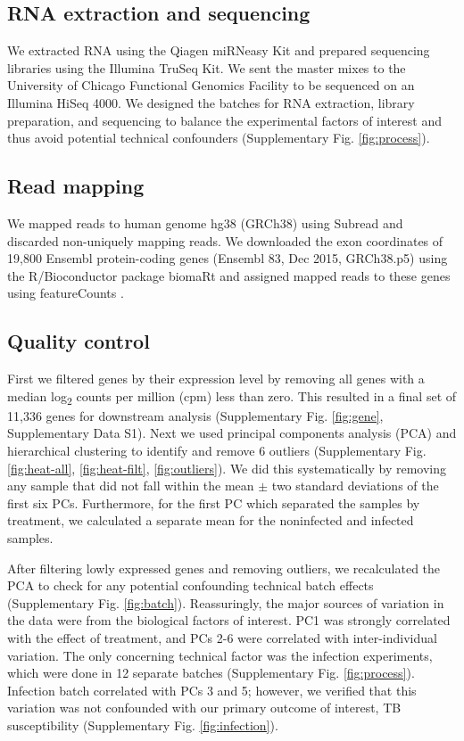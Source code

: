 \documentclass[fleqn,10pt]{wlscirep}
\begin{document}
\subsection*{RNA extraction and sequencing}

We extracted RNA using the Qiagen miRNeasy Kit and prepared sequencing
libraries using the Illumina TruSeq Kit. We sent the master mixes to
the University of Chicago Functional Genomics Facility to be sequenced
on an Illumina HiSeq 4000. We designed the batches for RNA extraction,
library preparation, and sequencing to balance the experimental
factors of interest and thus avoid potential technical confounders
(Supplementary Fig. \ref{fig:process}).
\subsection*{Read mapping}

We mapped reads to human genome hg38 (GRCh38) using Subread
\cite{Liao2013} and discarded non-uniquely mapping reads. We
downloaded the exon coordinates of 19,800 Ensembl protein-coding genes
(Ensembl 83, Dec 2015, GRCh38.p5) using the R/Bioconductor
\cite{Huber2015} package biomaRt \cite{Durinck2005, Durinck2009} and
assigned mapped reads to these genes using featureCounts
\cite{Liao2014}.
\subsection*{Quality control}

First we filtered genes by their expression level by removing all
genes with a median log\textsubscript{2} counts per million (cpm) less
than zero. This resulted in a final set of 11,336 genes for downstream
analysis (Supplementary Fig. \ref{fig:gene}, Supplementary Data S1).
Next we used principal components analysis (PCA) and hierarchical
clustering to identify and remove 6 outliers (Supplementary Fig.
\ref{fig:heat-all}, \ref{fig:heat-filt}, \ref{fig:outliers}). We did
this systematically by removing any sample that did not fall within
the mean $\pm$ two standard deviations of the first six PCs.
Furthermore, for the first PC which separated the samples by
treatment, we calculated a separate mean for the noninfected and
infected samples.

After filtering lowly expressed genes and removing outliers, we
recalculated the PCA to check for any potential confounding technical
batch effects (Supplementary Fig. \ref{fig:batch}). Reassuringly, the
major sources of variation in the data were from the biological
factors of interest. PC1 was strongly correlated with the effect of
treatment, and PCs 2-6 were correlated with inter-individual
variation. The only concerning technical factor was the infection
experiments, which were done in 12 separate batches (Supplementary
Fig. \ref{fig:process}). Infection batch correlated with PCs 3 and 5;
however, we verified that this variation was not confounded with our
primary outcome of interest, TB susceptibility (Supplementary Fig.
\ref{fig:infection}).
\end{document}
